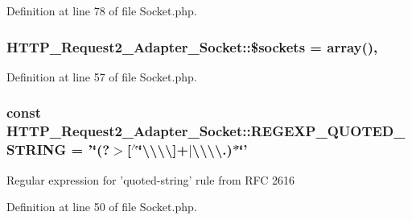 Definition at line 78 of file Socket.\-php.

\hypertarget{classHTTP__Request2__Adapter__Socket_ac7d848682d9289b2c270abb214338455}{
\subsubsection[{\$sockets}]{\setlength{\rightskip}{0pt plus 5cm}H\-T\-T\-P\-\_\-\-Request2\-\_\-\-Adapter\-\_\-\-Socket\-::\$sockets = array()\hspace{0.3cm}{\ttfamily [static]}, {\ttfamily [protected]}}}\label{classHTTP__Request2__Adapter__Socket_ac7d848682d9289b2c270abb214338455}


Definition at line 57 of file Socket.\-php.

\hypertarget{classHTTP__Request2__Adapter__Socket_a6c107bbe3366105b84ab79ccedda35c9}{
\subsubsection[{R\-E\-G\-E\-X\-P\-\_\-\-Q\-U\-O\-T\-E\-D\-\_\-\-S\-T\-R\-I\-N\-G}]{\setlength{\rightskip}{0pt plus 5cm}const H\-T\-T\-P\-\_\-\-Request2\-\_\-\-Adapter\-\_\-\-Socket\-::\-R\-E\-G\-E\-X\-P\-\_\-\-Q\-U\-O\-T\-E\-D\-\_\-\-S\-T\-R\-I\-N\-G = '\char`\"{}(?$>$\mbox{[}$^\wedge$\char`\"{}\textbackslash{}\textbackslash{}\textbackslash{}\textbackslash{}\mbox{]}+$|$\textbackslash{}\textbackslash{}\textbackslash{}\textbackslash{}.)$\ast$\char`\"{}'}}\label{classHTTP__Request2__Adapter__Socket_a6c107bbe3366105b84ab79ccedda35c9}
Regular expression for 'quoted-\/string' rule from R\-F\-C 2616 

Definition at line 50 of file Socket.\-php.

